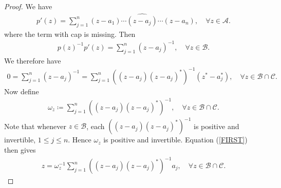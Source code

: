 \documentclass[10pt,a4paper]{amsart}
\begin{document}
\begin{proof}
	We have 
	\begin{align*}
		p'(z)=\sum_{j=1}^{n}(z-a_1)\cdots \widehat{(z-a_j)}\cdots (z-a_n), \quad \forall z \in \mathcal{A}.
	\end{align*}
	where the term with cap is missing. Then 
	\begin{align*}
		p(z)^{-1}	p'(z)=\sum_{j=1}^{n}(z-a_j)^{-1}, \quad \forall z \in \mathcal{B}.
	\end{align*}
We therefore have 
\begin{align}\label{FIRST}
	0=\sum_{j=1}^{n}(z-a_j)^{-1}=\sum_{j=1}^{n}((z-a_j)(z-a_j)^*)^{-1}(z^*-a_j^*), \quad \forall z \in \mathcal{B}\cap  \mathcal{C}.
\end{align}
Now  define 
\begin{align*}
	\omega_z \coloneqq \sum_{j=1}^{n}((z-a_j)(z-a_j)^*)^{-1}, \quad \forall z \in \mathcal{B}\cap  \mathcal{C}.
\end{align*}
Note that whenever $ z \in \mathcal{B}$, each $((z-a_j)(z-a_j)^*)^{-1}$ is positive and invertible, $1\leq j \leq n$. Hence $\omega_z$ is positive and invertible. Equation (\ref{FIRST}) then gives 
\begin{align*}
z=\omega_z^{-1}\sum_{j=1}^{n}((z-a_j)(z-a_j)^*)^{-1}a_j, \quad \forall z \in \mathcal{B}\cap  \mathcal{C}.
\end{align*}
\end{proof}
\end{document}
